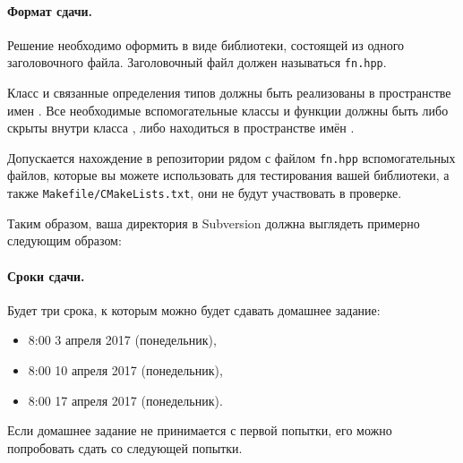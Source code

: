 \documentclass[a4paper,10pt]{article}
\begin{document}
\paragraph{Формат сдачи.}
Решение необходимо оформить в виде библиотеки, состоящей из одного заголовочного файла.
Заголовочный файл должен называться {\tt fn.hpp}.

Класс  и связанные определения типов должны быть реализованы в
пространстве имен . Все необходимые вспомогательные классы и функции
должны быть либо скрыты внутри класса , либо находиться в
пространстве имён .

Допускается нахождение в репозитории рядом с файлом {\tt fn.hpp} вспомогательных
файлов, которые вы можете использовать для тестирования вашей библиотеки, а
также {\tt Makefile/CMakeLists.txt}, они не будут участвовать в проверке.

Таким образом, ваша директория в Subversion должна выглядеть примерно следующим образом:

\paragraph{Сроки сдачи.}
Будет три срока, к которым можно будет сдавать домашнее задание:
\begin{itemize}
    \item 8:00 3 апреля 2017 (понедельник),
    \item 8:00 10 апреля 2017 (понедельник), 
    \item 8:00 17 апреля 2017 (понедельник).
\end{itemize}
Если домашнее задание не принимается с первой попытки, его
можно попробовать сдать со следующей попытки.
\end{document}
